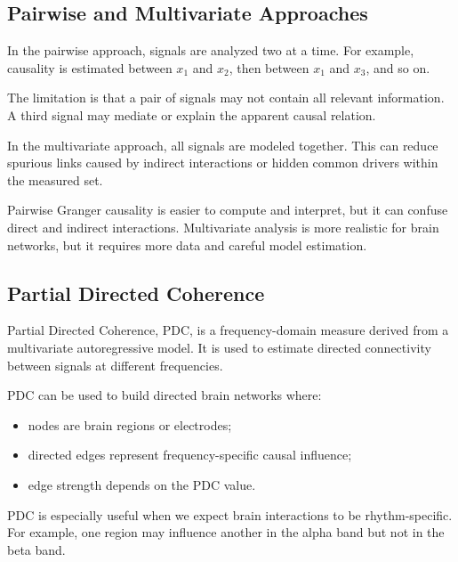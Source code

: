 \subsection{Pairwise and Multivariate Approaches}

In the pairwise approach, signals are analyzed two at a time. For example, causality is estimated between $x_1$ and $x_2$, then between $x_1$ and $x_3$, and so on.

The limitation is that a pair of signals may not contain all relevant information. A third signal may mediate or explain the apparent causal relation.

In the multivariate approach, all signals are modeled together. This can reduce spurious links caused by indirect interactions or hidden common drivers within the measured set.

\begin{authornote}
Pairwise Granger causality is easier to compute and interpret, but it can confuse direct and indirect interactions. Multivariate analysis is more realistic for brain networks, but it requires more data and careful model estimation.
\end{authornote}

\subsection{Partial Directed Coherence}

Partial Directed Coherence, PDC, is a frequency-domain measure derived from a multivariate autoregressive model. It is used to estimate directed connectivity between signals at different frequencies.

PDC can be used to build directed brain networks where:

\begin{itemize}[noitemsep]
    \item nodes are brain regions or electrodes;
    \item directed edges represent frequency-specific causal influence;
    \item edge strength depends on the PDC value.
\end{itemize}

\begin{authornote}
PDC is especially useful when we expect brain interactions to be rhythm-specific. For example, one region may influence another in the alpha band but not in the beta band.
\end{authornote}

